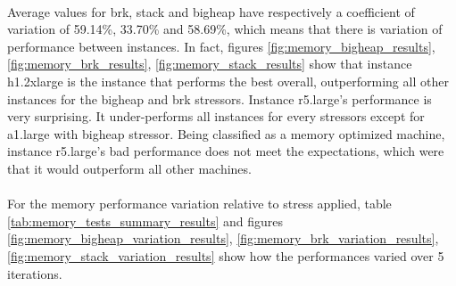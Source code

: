 \documentclass[11pt]{article}
\begin{document}
		\paragraph{} Average values for brk, stack and bigheap have respectively
		a coefficient of variation of 59.14\%, 33.70\% and 58.69\%, which means
		that there is variation of performance between instances. In fact,
		figures \ref{fig:memory_bigheap_results}, \ref{fig:memory_brk_results},
		\ref{fig:memory_stack_results} show that instance h1.2xlarge is the
		instance that performs the best overall, outperforming all other
		instances for the bigheap and brk stressors.  Instance r5.large's
		performance is very surprising. It under-performs all instances for
		every stressors except for a1.large with bigheap stressor. Being
		classified as a memory optimized machine, instance r5.large's bad
		performance does not meet the expectations, which were that it would
		outperform all other machines.

		\paragraph{} For the memory performance variation relative
		to stress applied, table \ref{tab:memory_tests_summary_results} and figures
		\ref{fig:memory_bigheap_variation_results}, \ref{fig:memory_brk_variation_results},
		\ref{fig:memory_stack_variation_results} show how the
		performances varied over 5 iterations.
\end{document}
